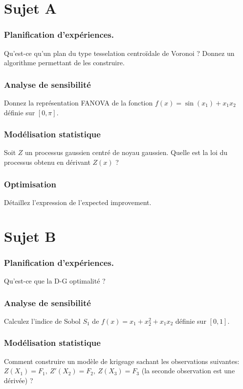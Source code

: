 \documentclass{article}
\begin{document}
\hline
\section*{Sujet A}
\subsubsection*{Planification d'expériences.}
Qu'est-ce qu'un plan du type tesselation centroïdale de Voronoi ? Donnez un algorithme permettant de les construire.

\subsubsection*{Analyse de sensibilité}
Donnez la représentation FANOVA de la fonction $f(x) = \sin(x_1) + x_1 x_2$ définie sur $[0, \pi]$. 

\subsubsection*{Modélisation statistique}
Soit $Z$ un processus gaussien centré de noyau gaussien. Quelle est la loi du processus obtenu en dérivant $Z(x)$ ?

\subsubsection*{Optimisation}
Détaillez l'expression de l'expected improvement.
\vspace{1cm}
\hline
\vspace{5cm}

\hline
\section*{Sujet B}
\subsubsection*{Planification d'expériences.}
Qu'est-ce que la D-G optimalité ?

\subsubsection*{Analyse de sensibilité}
Calculez l'indice de Sobol $S_1$ de $f(x) = x_1 + x_2^2 + x_1 x_2$ définie sur $[0, 1]$.

\subsubsection*{Modélisation statistique}
Comment construire un modèle de krigeage sachant les observations suivantes: $Z(X_1)=F_1,\ Z'(X_2)=F_2,\ Z(X_3)=F_3$ (la seconde observation est une dérivée) ?
\end{document}
